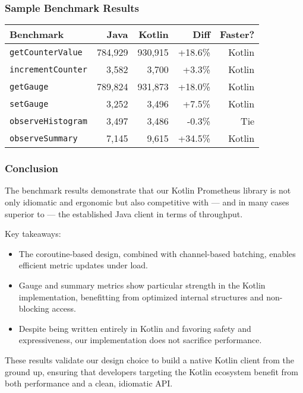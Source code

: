 \subsubsection*{Sample Benchmark Results}

\begin{center}
\begin{tabular}{lrrrr}
\toprule
\textbf{Benchmark} & \textbf{Java} & \textbf{Kotlin} & \textbf{Diff} & \textbf{Faster?} \\
\midrule
\texttt{getCounterValue}        & 784,929 & 930,915 & +18.6\% & Kotlin \\
\texttt{incrementCounter}       & 3,582   & 3,700   & +3.3\%  & Kotlin \\
\texttt{getGauge}               & 789,824 & 931,873 & +18.0\% & Kotlin \\
\texttt{setGauge}               & 3,252   & 3,496   & +7.5\%  & Kotlin \\
\texttt{observeHistogram}       & 3,497   & 3,486   & -0.3\%  & Tie \\
\texttt{observeSummary}         & 7,145   & 9,615   & +34.5\% & Kotlin \\
\bottomrule
\end{tabular}
\end{center}

\subsubsection*{Conclusion}

The benchmark results demonstrate that our Kotlin Prometheus library is not only idiomatic and ergonomic but also competitive with — and in many cases superior to — the established Java client in terms of throughput.

Key takeaways:
\begin{itemize}
    \item The coroutine-based design, combined with channel-based batching, enables efficient metric updates under load.
    \item Gauge and summary metrics show particular strength in the Kotlin implementation, benefitting from optimized internal structures and non-blocking access.
    \item Despite being written entirely in Kotlin and favoring safety and expressiveness, our implementation does not sacrifice performance.
\end{itemize}

These results validate our design choice to build a native Kotlin client from the ground up, ensuring that developers targeting the Kotlin ecosystem benefit from both performance and a clean, idiomatic API.



